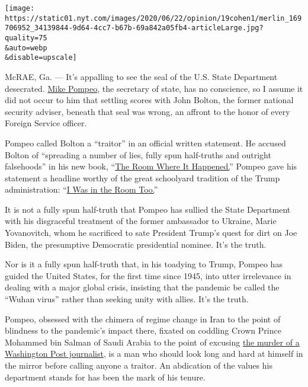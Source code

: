 \texttt{[image: https://static01.nyt.com/images/2020/06/22/opinion/19cohen1/merlin\_169706952\_34139844-9d64-4cc7-b67b-69a842a05fb4-articleLarge.jpg?quality=75\\\&auto=webp\\\&disable=upscale]}

McRAE, Ga. --- It's appalling to see the seal of the U.S. State
Department desecrated.
\href{https://www.nytimes.com/2020/08/07/world/asia/pompeo-russia-afghanistan-bounties.html}{Mike
Pompeo}, the secretary of state, has no conscience, so I assume it did
not occur to him that settling scores with John Bolton, the former
national security adviser, beneath that seal was wrong, an affront to
the honor of every Foreign Service officer.

Pompeo called Bolton a ``traitor'' in an official written statement. He
accused Bolton of ``spreading a number of lies, fully spun half-truths
and outright falsehoods'' in his new book,
``\href{https://www.nytimes.com/2020/06/18/us/politics/john-bolton-memoir-takeaways.html}{The
Room Where It Happened.}'' Pompeo gave his statement a headline worthy
of the great schoolyard tradition of the Trump administration:
``\href{https://www.google.com/url?q=https://www.state.gov/i-was-in-the-room-too/\&sa=D\&ust=1592671298995000\&usg=AFQjCNF78FCDO-PQIapEmpDnV3UM3pH0kg}{I
Was in the Room Too.}''

It is not a fully spun half-truth that Pompeo has sullied the State
Department with his disgraceful treatment of the former ambassador to
Ukraine, Marie Yovanovitch, whom he sacrificed to sate President Trump's
quest for dirt on Joe Biden, the presumptive Democratic presidential
nominee. It's the truth.

Nor is it a fully spun half-truth that, in his toadying to Trump, Pompeo
has guided the United States, for the first time since 1945, into utter
irrelevance in dealing with a major global crisis, insisting that the
pandemic be called the ``Wuhan virus'' rather than seeking unity with
allies. It's the truth.

Pompeo, obsessed with the chimera of regime change in Iran to the point
of blindness to the pandemic's impact there, fixated on coddling Crown
Prince Mohammed bin Salman of Saudi Arabia to the point of excusing
\href{https://www.nytimes.com/2019/12/26/opinion/jamal-khashoggi-saudi-arabia.html}{the
murder of a Washington Post journalist,} is a man who should look long
and hard at himself in the mirror before calling anyone a traitor. An
abdication of the values his department stands for has been the mark of
his tenure.

